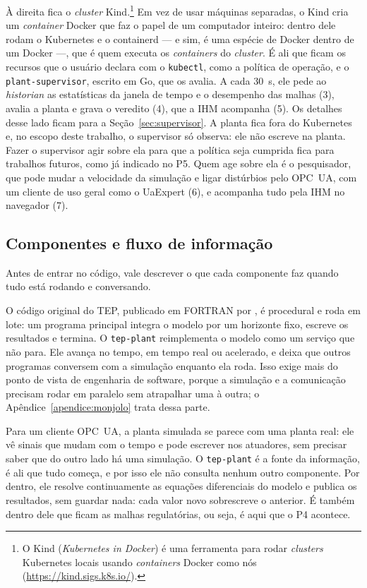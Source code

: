 À direita fica o \textit{cluster} Kind.\footnote{O Kind (\textit{Kubernetes in Docker}) é uma ferramenta para rodar \textit{clusters} Kubernetes locais usando \textit{containers} Docker como nós (\url{https://kind.sigs.k8s.io/}).} Em vez de usar máquinas separadas, o Kind cria um \textit{container} Docker que faz o papel de um computador inteiro: dentro dele rodam o Kubernetes e o containerd — e sim, é uma espécie de Docker dentro de um Docker —, que é quem executa os \textit{containers} do \textit{cluster}. É ali que ficam os recursos que o usuário declara com o \texttt{kubectl}, como a política de operação, e o \texttt{plant-supervisor}, escrito em Go, que os avalia. A cada 30~s, ele pede ao \textit{historian} as estatísticas da janela de tempo e o desempenho das malhas (3), avalia a planta e grava o veredito (4), que a IHM acompanha (5). Os detalhes desse lado ficam para a Seção~\ref{sec:supervisor}. A planta fica fora do Kubernetes e, no escopo deste trabalho, o supervisor só observa: ele não escreve na planta. Fazer o supervisor agir sobre ela para que a política seja cumprida fica para trabalhos futuros, como já indicado no P5. Quem age sobre ela é o pesquisador, que pode mudar a velocidade da simulação e ligar distúrbios pelo OPC~UA, com um cliente de uso geral como o UaExpert (6), e acompanha tudo pela IHM no navegador (7).

\subsection{Componentes e fluxo de informação}
\label{subsec:componentes}

Antes de entrar no código, vale descrever o que cada componente faz quando tudo está rodando e conversando.

O código original do TEP, publicado em FORTRAN por , é procedural e roda em lote: um programa principal integra o modelo por um horizonte fixo, escreve os resultados e termina. O \texttt{tep-plant} reimplementa o modelo como um serviço que não para. Ele avança no tempo, em tempo real ou acelerado, e deixa que outros programas conversem com a simulação enquanto ela roda. Isso exige mais do ponto de vista de engenharia de software, porque a simulação e a comunicação precisam rodar em paralelo sem atrapalhar uma à outra; o Apêndice~\ref{apendice:monjolo} trata dessa parte.

Para um cliente OPC~UA, a planta simulada se parece com uma planta real: ele vê sinais que mudam com o tempo e pode escrever nos atuadores, sem precisar saber que do outro lado há uma simulação. O \texttt{tep-plant} é a fonte da informação, é ali que tudo começa, e por isso ele não consulta nenhum outro componente. Por dentro, ele resolve continuamente as equações diferenciais do modelo e publica os resultados, sem guardar nada: cada valor novo sobrescreve o anterior. É também dentro dele que ficam as malhas regulatórias, ou seja, é aqui que o P4 acontece.

